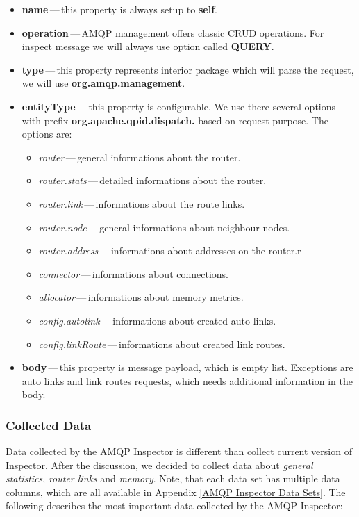 \begin{itemize}
	\setlength\itemsep{0em}
		\item \textbf{name}\,---\,this property is always setup to \textbf{self}.
		\item \textbf{operation}\,---\,AMQP management offers classic CRUD operations. For inspect message we will always use option called \textbf{QUERY}.
		\item \textbf{type}\,---\,this property represents interior package which will parse the request, we will use \textbf{org.amqp.management}.
		\item \textbf{entityType}\,---\,this property is configurable. We use there several options with prefix \textbf{org.apache.qpid.dispatch.} based on request purpose. The options are:
		\begin{itemize}
			\setlength\itemsep{0em}
			\item \emph{router}\,---\,general informations about the router.
			\item \emph{router.stats}\,---\,detailed informations about the router.
			\item \emph{router.link}\,---\,informations about the route links.
			\item \emph{router.node}\,---\,general informations about neighbour nodes.
			\item \emph{router.address}\,---\,informations about addresses on the router.r
			\item \emph{connector}\,---\,informations about connections.
			\item \emph{allocator}\,---\,informations about memory metrics.
			\item \emph{config.autolink}\,---\,informations about created auto links.
			\item \emph{config.linkRoute}\,---\,informations about created link routes.
		\end{itemize}
		\item \textbf{body}\,---\,this property is message payload, which is empty list. Exceptions are auto links and link routes requests, which needs additional information in the body.
\end{itemize}

\subsubsection*{Collected Data}
\label{Collected Data}
Data collected by the AMQP Inspector is different than collect current version of Inspector. After the discussion, we decided to collect data about \emph{general statistics}, \emph{router links} and \emph{memory}. Note, that each data set has multiple data columns, which are all available in Appendix \ref{AMQP Inspector Data Sets}. The following describes the most important data collected by the AMQP Inspector:

